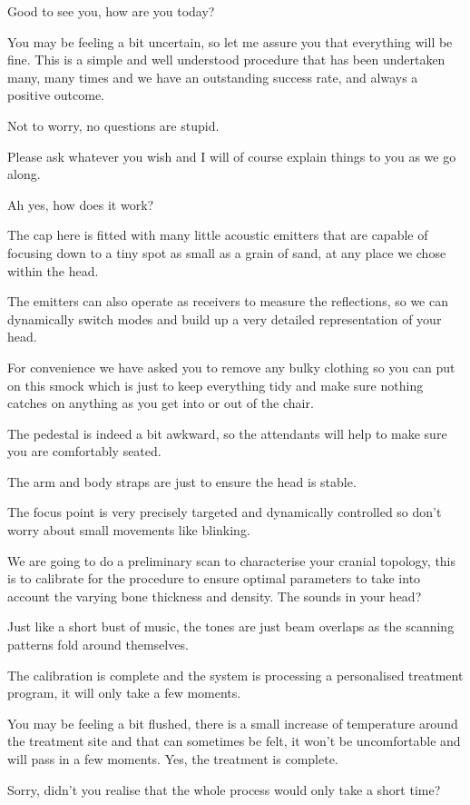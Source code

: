 Good to see you, how are you today?

You may be feeling a bit uncertain, so let me assure you that
everything will be fine. This is a simple and well understood
procedure that has been undertaken many, many times and we have an
outstanding success rate, and always a positive outcome.

Not to worry, no questions are stupid.

Please ask whatever you wish and I will of course explain things to
you as we go along.

Ah yes, how does it work?

The cap here is fitted with many little acoustic emitters that are
capable of focusing down to a tiny spot as small as a grain of sand,
at any place we chose within the head.

The emitters can also operate as receivers to measure the reflections,
so we can dynamically switch modes and build up a very detailed
representation of your head.

For convenience we have asked you to remove any bulky clothing so you
can put on this smock which is just to keep everything tidy and make
sure nothing catches on anything as you get into or out of the chair.

The pedestal is indeed a bit awkward, so the attendants will help to
make sure you are comfortably seated.

The arm and body straps are just to ensure the head is stable.

The focus point is very precisely targeted and dynamically controlled
so don’t worry about small movements like blinking.

We are going to do a preliminary scan to characterise your cranial
topology, this is to calibrate for the procedure to ensure optimal
parameters to take into account the varying bone thickness and
density.  The sounds in your head?

Just like a short bust of music, the tones are just beam overlaps as
the scanning patterns fold around themselves.

The calibration is complete and the system is processing a
personalised treatment program, it will only take a few moments.

You may be feeling a bit flushed, there is a small increase of
temperature around the treatment site and that can sometimes be felt,
it won’t be uncomfortable and will pass in a few moments.  Yes, the
treatment is complete.

Sorry, didn't you realise that the whole process would only take a
short time?

